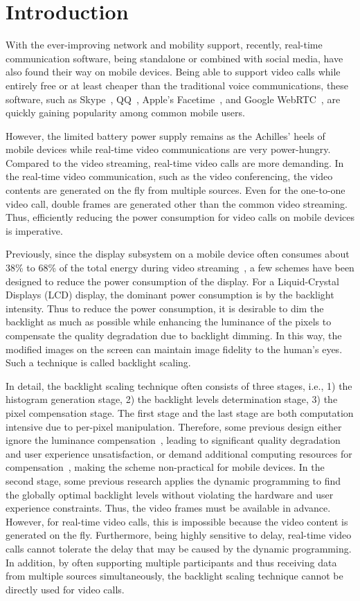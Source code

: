 \section{Introduction}

With the ever-improving network and mobility support, recently,
real-time communication software, being standalone or combined with
social media, have also found their way on mobile devices.  Being able
to support video calls while entirely free or at least cheaper than
the traditional voice communications, these software, such as
Skype~\cite{skype}, QQ~\cite{qq}, Apple's Facetime~\cite{facetime},
and Google WebRTC~\cite{webrtcproject}, are quickly gaining popularity
among common mobile users.

However, the limited battery power supply remains as the Achilles'
heels of mobile devices while real-time video communications are very
power-hungry. Compared to the video streaming, real-time video calls
are more demanding. In the real-time video communication, such as the
video conferencing, the video contents are generated on the fly from
multiple sources. Even for the one-to-one video call, double frames
are generated other than the common video streaming. Thus, efficiently
reducing the power consumption for video calls on mobile devices is
imperative.

Previously, since the display subsystem on a mobile device often
consumes about 38\% to 68\% of the total energy during video
streaming~\cite{AG10}, a few schemes have been designed to reduce the
power consumption of the display. For a Liquid-Crystal Displays (LCD)
display, the dominant power consumption is by the backlight
intensity. Thus to reduce the power consumption, it is desirable to
dim the backlight as much as possible while enhancing the luminance of
the pixels to compensate the quality degradation due to backlight
dimming.  In this way, the modified images on the screen can maintain
image fidelity to the human's eyes. Such a technique is called
backlight scaling.

In detail, the backlight scaling technique often consists of three
stages, i.e., 1) the histogram generation stage, 2) the backlight
levels determination stage, 3) the pixel compensation stage. The first
stage and the last stage are both computation intensive due to
per-pixel manipulation. Therefore, some previous design either ignore
the luminance compensation~\cite{HLH11}, leading to significant
quality degradation and user experience unsatisfaction, or demand
additional computing resources for compensation~\cite{LHH14}, making
the scheme non-practical for mobile devices.  In the second stage,
some previous research applies the dynamic programming to find the
globally optimal backlight levels without violating the hardware and
user experience constraints. Thus, the video frames must be available
in advance.  However, for real-time video calls, this is impossible
because the video content is generated on the fly.  Furthermore, being
highly sensitive to delay, real-time video calls cannot tolerate the
delay that may be caused by the dynamic programming. In addition, by
often supporting multiple participants and thus receiving data from
multiple sources simultaneously, the backlight scaling technique
cannot be directly used for video calls.


